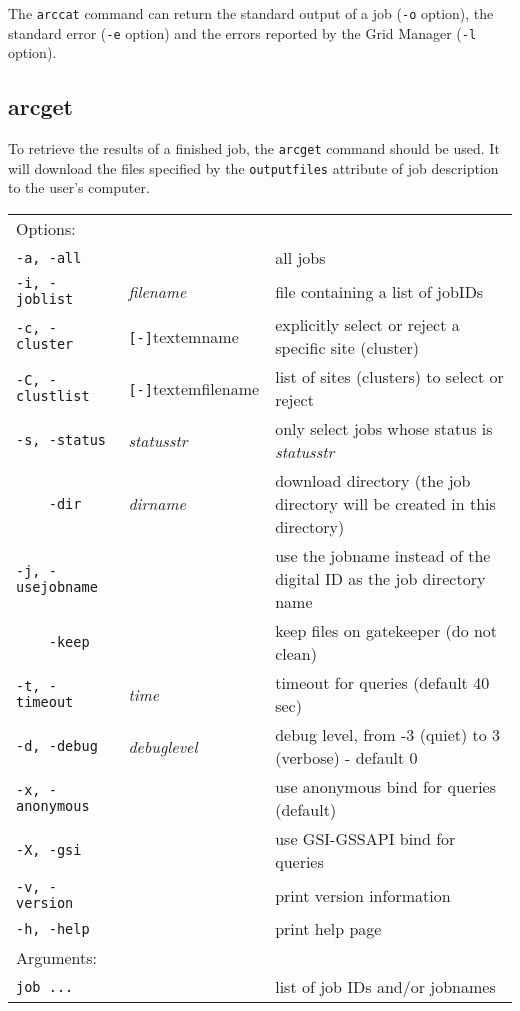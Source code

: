 The \texttt{arccat} command can return the standard output of a job
(\texttt{-o} option), the standard error (\texttt{-e} option) and the
errors reported by the Grid Manager (\texttt{-l} option).

\begin{framed}

\end{framed}


\subsection{arcget}
\label{sec:arcget}

To retrieve the results of a finished job, the \texttt{arcget}
 command should be used. It
will download the files specified by the \texttt{outputfiles}
attribute of job description to the user's computer.

\hspace*{0.5cm}
\begin{shaded}
\end{shaded}
\begin{longtable}{llp{8cm}}
   Options:&&\\
   \texttt{-a, -all}& & all jobs\\
   \texttt{-i, -joblist}& \textit{filename} & file containing a list of jobIDs\\
   \texttt{-c, -cluster}&\verb#[-]#textem{name}&explicitly select or reject a specific site (cluster)\\
   \texttt{-C, -clustlist}&\verb#[-]#textem{filename}&list of sites (clusters) to select or reject\\
   \texttt{-s, -status}& \textit{statusstr} &only select jobs whose status is \textit{statusstr}\\
   \texttt{~~~~-dir} & \textit{dirname} & download directory (the job directory will be created in this directory)\\
   \texttt{-j, -usejobname}& & use the jobname instead of the digital ID as the job directory name\\
   \texttt{~~~~-keep}& & keep files on gatekeeper (do not clean)\\
   \texttt{-t, -timeout}& \textit{time} & timeout for queries (default 40 sec)\\
   \texttt{-d, -debug}& \textit{debuglevel} &debug level, from -3 (quiet) to 3 (verbose) - default 0\\
   \texttt{-x, -anonymous}& & use anonymous bind for queries (default)\\
   \texttt{-X, -gsi}& & use GSI-GSSAPI bind for queries\\
   \texttt{-v, -version}& & print version information\\
   \texttt{-h, -help}& & print help page\\
   Arguments:&&\\
   \texttt{job ...} && list of job IDs and/or jobnames\\
\end{longtable}


